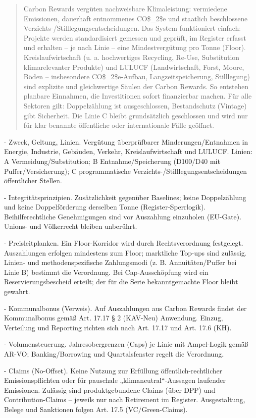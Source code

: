 \documentclass[12pt,a4paper]{scrartcl}
\begin{document}
\begin{quote}
  Carbon Rewards vergüten nachweisbare Klimaleistung: vermiedene Emissionen, dauerhaft entnommenes CO\$\_2\$e und staatlich beschlossene Verzichts-/Stilllegungsentscheidungen. Das System funktioniert einfach: Projekte werden standardisiert gemessen und geprüft, im Register erfasst und erhalten -- je nach Linie -- eine Mindestvergütung pro Tonne (Floor). Kreislaufwirtschaft (u. a. hochwertiges Recycling, Re-Use, Substitution klimarelevanter Produkte) und LULUCF (Landwirtschaft, Forst, Moore, Böden -- insbesondere CO\$\_2\$e-Aufbau, Langzeitspeicherung, Stilllegung) sind explizite und gleichwertige Säulen der Carbon Rewards. So entstehen planbare Einnahmen, die Investitionen sofort finanzierbar machen. Für alle Sektoren gilt: Doppelzählung ist ausgeschlossen, Bestandschutz (Vintage) gibt Sicherheit. Die Linie C bleibt grundsätzlich geschlossen und wird nur für klar benannte öffentliche oder internationale Fälle geöffnet.
\end{quote}

- Zweck, Geltung, Linien. Vergütung überprüfbarer Minderungen/Entnahmen in Energie, Industrie, Gebäuden, Verkehr, Kreislaufwirtschaft und LULUCF. Linien: A Vermeidung/Substitution; B Entnahme/Speicherung (D100/D40 mit Puffer/Versicherung); C programmatische Verzichts-/Stilllegungsentscheidungen öffentlicher Stellen.

- Integritätsprinzipien. Zusätzlichkeit gegenüber Baselines; keine Doppelzählung und keine Doppelförderung derselben Tonne (Register-Sperrlogik). Beihilferechtliche Genehmigungen sind vor Auszahlung einzuholen (EU-Gate). Unions- und Völkerrecht bleiben unberührt.

- Preisleitplanken. Ein Floor-Korridor wird durch Rechtsverordnung festgelegt. Auszahlungen erfolgen mindestens zum Floor; marktliche Top-ups sind zulässig. Linien- und methodenspezifische Zahlungsmodi (z. B. Annuitäten/Puffer bei Linie B) bestimmt die Verordnung. Bei Cap-Ausschöpfung wird ein Reservierungsbescheid erteilt; der für die Serie bekanntgemachte Floor bleibt gewahrt.

- Kommunalbonus (Verweis). Auf Auszahlungen aus Carbon Rewards findet der Kommunalbonus gemäß Art. 17.17 § 2 (KAV-Neu) Anwendung. Einzug, Verteilung und Reporting richten sich nach Art. 17.17 und Art. 17.6 (KH).

- Volumensteuerung. Jahresobergrenzen (Caps) je Linie mit Ampel-Logik gemäß AR-VO; Banking/Borrowing und Quartalsfenster regelt die Verordnung.

- Claims (No-Offset). Keine Nutzung zur Erfüllung öffentlich-rechtlicher Emissionspflichten oder für pauschale „klimaneutral“-Aussagen laufender Emissionen. Zulässig sind produktgebundene Claims (über DPP) und Contribution-Claims -- jeweils nur nach Retirement im Register. Ausgestaltung, Belege und Sanktionen folgen Art. 17.5 (VC/Green-Claims).
\end{document}
